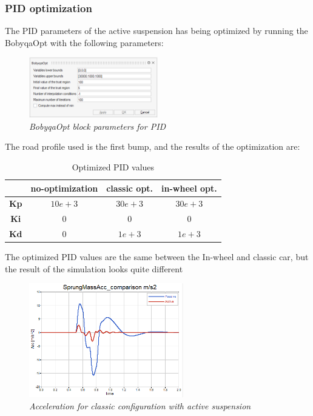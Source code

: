 \documentclass{article}
\numberwithin{equation}{section}
\numberwithin{figure}{section}
\numberwithin{table}{section}
\numberwithin{table}{section}
\begin{document}
\subsubsection{PID optimization}
The PID parameters of the active suspension has being optimized by running the BobyqaOpt with the following parameters:
\begin{figure}[H]
    \centering
    \includegraphics[width=0.5\textwidth]{Pictures/bobyapid.png}
    \caption{\emph{BobyqaOpt block parameters for PID}}
    \label{fig:bobyaopt_param_PID}
\end{figure}    
The road profile used is the first bump, and the results of the optimization are:
\begin{table}[H]
    \centering
    \begin{tabular}{|c|c|c|c|}
    \hline
         &no-optimization& classic opt. & in-wheel opt. \\
         \hline\hline
         \textbf{Kp}& $10e+3$ &$30e+3$ &$30e+3$\\
         \hline
         \textbf{Ki}& $0$ & $0$ & $0$\\
         \hline
         \textbf{Kd}& $0$ & $1e+3$ & $1e+3$\\
         \hline
    \end{tabular}
    \caption{Optimized PID values}
    \label{tab:optimization_PID}
\end{table}
The optimized PID values are the same between the In-wheel and classic car, but the result of the simulation looks quite different


\begin{figure}[H]
    \centering
    \includegraphics[width=0.6\textwidth]{Pictures/Active (classic configuration P30000 D1000).png}
    \caption{\emph{Acceleration for classic configuration with active suspension}}
    \label{fig:Classic PID}
\end{figure}
\end{document}
